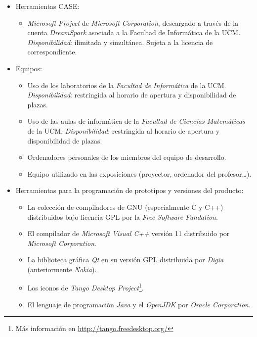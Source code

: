 \documentclass[11pt, a4paper, twoside]{report}
\begin{document}
\begin{itemize}
				\item Herramientas CASE: \begin{itemize}
					\item \textit{Microsoft Project} de \textit{Microsoft Corporation}, descargado a través de la cuenta \textit{DreamSpark} asociada a la Facultad de Informática de la UCM.
					\subitem \textit{Disponibilidad}: ilimitada y simultánea. Sujeta a la licencia de \software correspondiente.
				\end{itemize}
				
				\item Equipos: \begin{itemize}
					\item Uso de los laboratorios de la \textit{Facultad de Informática} de la UCM.
					\subitem \textit{Disponibilidad}: restringida al horario de apertura y disponibilidad de plazas.
					\item Uso de las aulas de informática de la \textit{Facultad de Ciencias Matemáticas} de la UCM.
					\subitem \textit{Disponibilidad}: restringida al horario de apertura y disponibilidad de plazas.
					\item Ordenadores personales de los miembros del equipo de desarrollo.
					\item Equipo utilizado en las exposiciones (proyector, ordenador del profesor\ldots).
				\end{itemize}

				\item Herramientas para la programación de prototipos y versiones del producto: \begin{itemize}
					\item La colección de compiladores de GNU (especialmente C y C++) distribuidos bajo licencia GPL por la \textit{Free Software Fundation}.
					\item El compilador de \textit{Microsoft Visual C++} versión 11 distribuido por \textit{Microsoft Corporation}.
					\item La biblioteca gráfica \textit{Qt} en su versión GPL distribuida por \textit{Digia} (anteriormente \textit{Nokia}).
					\item Los iconos de \textit{Tango Desktop Project}\footnote{Más información en \url{http://tango.freedesktop.org/}}.
					\item El lenguaje de programación \textit{Java} y el \software \textit{OpenJDK} por \textit{Oracle Corporation}.
				\end{itemize}


\end{itemize}
\end{document}
